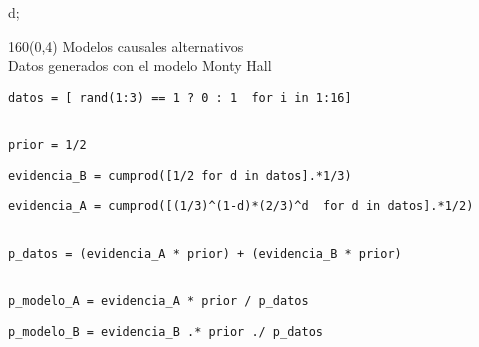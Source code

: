 \documentclass[shownotes,aspectratio=169]{beamer}
\begin{document}
\begin{frame}[plain]
\begin{textblock}{80}
{     {d};
}

\vspace{0.75cm}
\end{textblock}

\end{frame}

\begin{frame}
\begin{textblock}{160}(0,4)
\centering \LARGE Modelos causales alternativos \\
\Large Datos generados con el modelo Monty Hall
\end{textblock}
\vspace{1cm}


\begin{lstlisting}[belowskip=-0.6 \baselineskip]
datos = [ rand(1:3) == 1 ? 0 : 1  for i in 1:16]
\end{lstlisting}
\pause
\begin{lstlisting}[belowskip=-0.6 \baselineskip]

prior = 1/2
\end{lstlisting}
\pause
\begin{lstlisting}[belowskip=-0.6 \baselineskip]
evidencia_B = cumprod([1/2 for d in datos].*1/3)
\end{lstlisting}
\pause
\begin{lstlisting}[belowskip=-0.6 \baselineskip]
evidencia_A = cumprod([(1/3)^(1-d)*(2/3)^d  for d in datos].*1/2)
\end{lstlisting}
\pause
\begin{lstlisting}[belowskip=-0.6 \baselineskip]

p_datos = (evidencia_A * prior) + (evidencia_B * prior)
\end{lstlisting}
\pause
\begin{lstlisting}[belowskip=-0.6 \baselineskip]

p_modelo_A = evidencia_A * prior / p_datos
\end{lstlisting}
\pause
\begin{lstlisting}
p_modelo_B = evidencia_B .* prior ./ p_datos
\end{lstlisting}
\end{frame}
\end{document}
